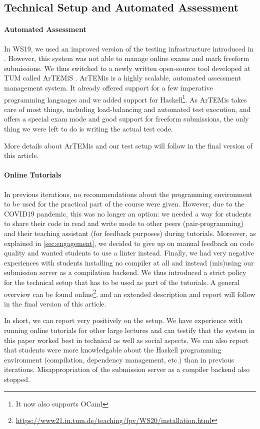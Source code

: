 \subsection{Technical Setup and Automated Assessment}\label{sec:tech_setup_test}

\paragraph{Automated Assessment}
In WS19, we used an improved version of
the testing infrastructure introduced in \cite{next_1100}.
However, this system was not able to manage online exams and mark freeform submissions.
We thus switched to a newly written open-source
tool developed at TUM called ArTEMiS \cite{artemis}.
ArTEMis is a highly scalable, automated assessment management system.
It already offered support for a few imperative programming languages
and we added support for Haskell\footnote{It now also supports OCaml}.
As ArTEMis takes care of most things,
including load-balancing and automated test execution,
and offers a special exam mode and good support for freeform submissions,
the only thing we were left to do is writing the actual test code.

More details about ArTEMis and our test setup will follow
in the final version of this article.

\paragraph{Online Tutorials}
In previous iterations,
no recommendations about the programming environment to be used for the practical part of the course
were given.
However, due to the COVID19 pandemic,
this was no longer an option:
we needed a way for students to share their code in read and write mode
to other peers (pair-programming) and their teaching assistant (for feedback purposes) during tutorials.
Moreover, as explained in \cref{sec:engagement},
we decided to give up on manual feedback on code quality
and wanted students to use a linter instead.
Finally, we had very negative experiences with students
installing no compiler at all
and instead (mis)using our submission server as a compilation backend.
We thus introduced a strict policy
for the technical setup that has to be used as part of
the tutorials.
A general overview can be found online\footnote{\url{https://www21.in.tum.de/teaching/fpv/WS20/installation.html}},
and an extended description and report will follow in the final version of this article.

In short, we can report very positively on the setup.
We have experience with running online tutorials for other large lectures and can testify that
the system in this paper worked best in technical as well as social aspects.
We can also report that students were more knowledgable
about the Haskell programming environment (compilation, dependency management, etc.) than in previous iterations.
Misappropriation of the submission server as a compiler backend also stopped.

